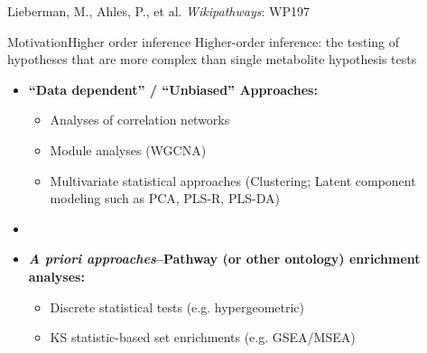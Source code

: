 \documentclass[xcolor=dvipsnames]{beamer}
\begin{document}
\begin{frame}
	\begin{center}
		
		Lieberman, M., Ahles, P., et al. \emph{Wikipathways}: WP197
	\end{center}
\end{frame}

\begin{frame}{Motivation}{Higher order inference}
	\vspace{-10pt}
	{\Large Higher-order inference: the testing of hypotheses that are more complex than single metabolite hypothesis tests} \vspace{7pt}
	
	\begin{itemize}
		\item \textbf{``Data dependent'' / ``Unbiased'' Approaches:} 
		\begin{itemize}
		\item Analyses of correlation networks
		\item Module analyses (WGCNA)
		\item Multivariate statistical approaches (Clustering; Latent component modeling such as PCA, PLS-R, PLS-DA)
		\end{itemize}
		\item[]
		\item \textbf{\emph{A priori approaches}--Pathway (or other ontology) enrichment analyses:} 
		\begin{itemize}
			\item Discrete statistical tests (e.g. hypergeometric)
			\item KS statistic-based set enrichments (e.g. GSEA/MSEA)
		\end{itemize}
	\end{itemize}
	
\end{frame}
\end{document}
